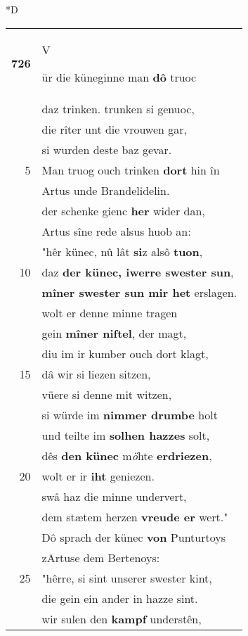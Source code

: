 \documentclass[8pt,a4paper,notitlepage]{article}
\begin{document}
\begin{table}[ht]
\begin{minipage}[t]{0.5\linewidth}
\small
\begin{center}*D
\end{center}
\begin{tabular}{rl}
\textbf{726} & \begin{large}V\end{large}ür die küneginne man \textbf{dô} truoc\\ 
 & daz trinken. trunken si genuoc,\\ 
 & die rîter unt die vrouwen gar,\\ 
 & si wurden deste baz gevar.\\ 
5 & Man truog ouch trinken \textbf{dort} hin în\\ 
 & Artus unde Brandelidelin.\\ 
 & der schenke gienc \textbf{her} wider dan,\\ 
 & Artus sîne rede alsus huob an:\\ 
 & "hêr künec, nû lât \textbf{si}z alsô \textbf{tuon},\\ 
10 & daz \textbf{der künec, iwerre swester sun},\\ 
 & \textbf{mîner swester sun mir het} erslagen.\\ 
 & wolt er denne minne tragen\\ 
 & gein \textbf{mîner niftel}, der magt,\\ 
 & diu im ir kumber ouch dort klagt,\\ 
15 & dâ wir si liezen sitzen,\\ 
 & vüere si denne mit witzen,\\ 
 & si würde im \textbf{nimmer drumbe} holt\\ 
 & und teilte im \textbf{solhen hazzes} solt,\\ 
 & dês \textbf{den künec} m\textit{ö}hte \textbf{erdriezen},\\ 
20 & wolt er ir \textbf{iht} geniezen.\\ 
 & swâ haz die minne undervert,\\ 
 & dem stætem herzen \textbf{vreude er} wert."\\ 
 & Dô sprach der künec \textbf{von} Punturtoys\\ 
 & zArtuse dem Bertenoys:\\ 
25 & "hêrre, si sint unserer swester kint,\\ 
 & die gein ein ander in hazze sint.\\ 
 & wir sulen den \textbf{kampf} understên,\\ 

\end{tabular}
\end{minipage}
\end{table}
\end{document}
